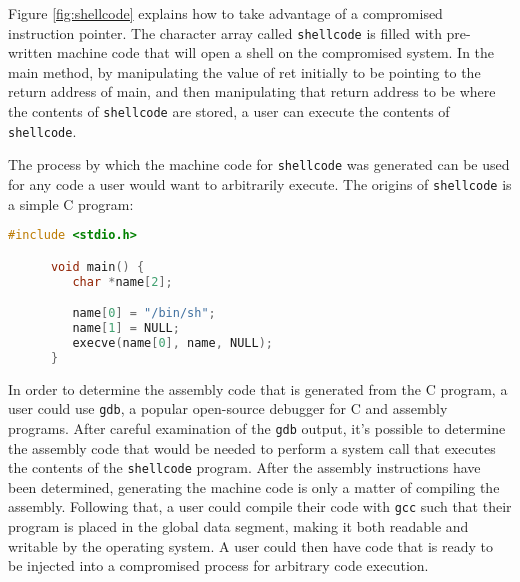 Figure \ref{fig:shellcode} explains how to take advantage of a compromised instruction pointer. The character array called \texttt{shellcode} is filled with pre-written machine code that will open a shell on the compromised system. In the main method, by manipulating the value of ret initially to be pointing to the return address of main, and then manipulating that return address to be where the contents of \texttt{shellcode} are stored, a user can execute the contents of \texttt{shellcode}.

The process by which the machine code for \texttt{shellcode} was generated can be used for any code a user would want to arbitrarily execute. The origins of \texttt{shellcode} is a simple C program:

      \begin{lstlisting}[language=C]
      #include <stdio.h>

      void main() {
         char *name[2];

         name[0] = "/bin/sh";
         name[1] = NULL;
         execve(name[0], name, NULL);
      }
      \end{lstlisting}

In order to determine the assembly code that is generated from the C program, a user could use \texttt{gdb}, a popular open-source debugger for C and assembly programs. After careful examination of the \texttt{gdb} output, it's possible to determine the assembly code that would be needed to perform a system call that executes the contents of the \texttt{shellcode} program. After the assembly instructions have been determined, generating the machine code is only a matter of compiling the assembly. Following that, a user could compile their code with \texttt{gcc} such that their program is placed in the global data segment, making it both readable and writable by the operating system. A user could then have code that is ready to be injected into a compromised process for arbitrary code execution. \cite{smash}
